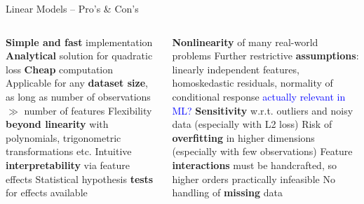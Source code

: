 \begin{frame}{Linear Models -- Pro's \& Con's}



\begin{columns}[onlytextwidth]
  \begin{column}{0.5\textwidth}
    
    \begin{procon}
      \setlength{\itemsep}{1pt}
      \setlength{\parskip}{1pt}
      \positem \textbf{Simple and fast} implementation
      \positem \textbf{Analytical} solution for quadratic loss
      \positem \textbf{Cheap} computation
      \positem Applicable for any \textbf{dataset size}, as long as number of 
      observations $\gg$ number of features
      \positem Flexibility \textbf{beyond linearity} with polynomials, 
      trigonometric transformations etc.
      \positem Intuitive \textbf{interpretability} via feature effects
      \positem Statistical hypothesis \textbf{tests} for effects available
    \end{procon}
  \end{column}

  \begin{column}{0.5\textwidth}
    
    \begin{itemize}
      \negitem \textbf{Nonlinearity} of many real-world problems
      \negitem Further restrictive \textbf{assumptions}: linearly independent 
      features, homoskedastic residuals, normality of conditional response 
      \textcolor{blue}{actually relevant in ML?}
      \negitem \textbf{Sensitivity} w.r.t. outliers and noisy data (especially 
      with L2 loss)
      \negitem Risk of \textbf{overfitting} in higher dimensions (especially 
      with few observations) 
      \negitem Feature \textbf{interactions} must be handcrafted, so higher
      orders practically infeasible
      \negitem No handling of \textbf{missing} data
    \end{itemize}
  \end{column}
\end{columns}

\vfill

\small


\end{frame}

